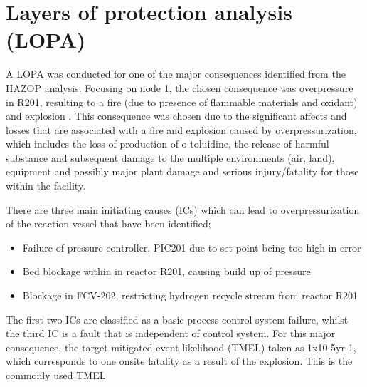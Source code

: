 \section{Layers of protection analysis (LOPA)}

A LOPA was conducted for one of the major consequences identified from the HAZOP analysis. Focusing on node 1, the chosen consequence was overpressure in R201, resulting to a fire (due to presence of flammable materials and oxidant) and explosion . This consequence was chosen due to the significant affects and losses that are associated with a fire and explosion caused by overpressurization, which includes the loss of production of o-toluidine, the release of harmful substance and subsequent damage to the multiple environments (air, land), equipment and possibly major plant damage and serious injury/fatality for those within the facility. 

There are three main initiating causes (ICs) which can lead to overpressurization of the reaction vessel that have been identified;

\begin{itemize}
\item Failure of pressure controller, PIC201 due to set point being too high in error
\item Bed blockage within in reactor R201, causing build up of pressure
\item Blockage in FCV-202, restricting hydrogen recycle stream from reactor R201

\end{itemize}

The first two ICs are classified as a basic process control system failure, whilst the third IC is a fault that is independent of control system. For this major consequence, the target mitigated event likelihood (TMEL) taken as 1x10-5yr-1, which corresponds to one onsite fatality as a result of the explosion. This is the commonly used TMEL






 